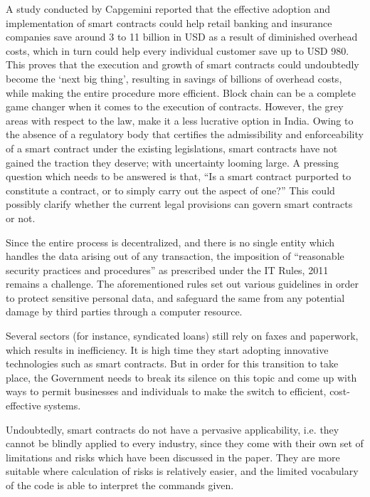 \begin{multicols}{2}
\noi
A study conducted by Capgemini reported that the effective adoption and implementation of
smart contracts could help retail banking and insurance companies save around 3 to 11 billion
in USD as a result of diminished overhead costs, which in turn could help every individual
customer save up to USD 980. This proves that the execution and growth of smart contracts
could undoubtedly become the ‘next big thing’, resulting in savings of billions of overhead
costs, while making the entire procedure more efficient. Block chain can be a complete game
changer when it comes to the execution of contracts. However, the grey areas with respect to
the law, make it a less lucrative option in India. Owing to the absence of a regulatory body
that certifies the admissibility and enforceability of a smart contract under the existing
legislations, smart contracts have not gained the traction they deserve; with uncertainty looming large. A pressing question which needs to be answered is that, “Is a smart contract
purported to constitute a contract, or to simply carry out the aspect of one?” This could
possibly clarify whether the current legal provisions can govern smart contracts or not. 

\noi
Since the entire process is decentralized, and there is no single entity which handles the data
arising out of any transaction, the imposition of “reasonable security practices and
procedures” as prescribed under the IT Rules, 2011 remains a challenge. The aforementioned
rules set out various guidelines in order to protect sensitive personal data, and safeguard the
same from any potential damage by third parties through a computer resource. 

\noi
Several sectors (for instance, syndicated loans) still rely on faxes and paperwork, which
results in inefficiency. It is high time they start adopting innovative technologies such as
smart contracts. But in order for this transition to take place, the Government needs to break
its silence on this topic and come up with ways to permit businesses and individuals to make
the switch to efficient, cost-effective systems.

\noi
Undoubtedly, smart contracts do not have a pervasive applicability, i.e. they cannot be
blindly applied to every industry, since they come with their own set of limitations and risks
which have been discussed in the paper. They are more suitable where calculation of risks is
relatively easier, and the limited vocabulary of the code is able to interpret the commands
given. 


\end{multicols}
